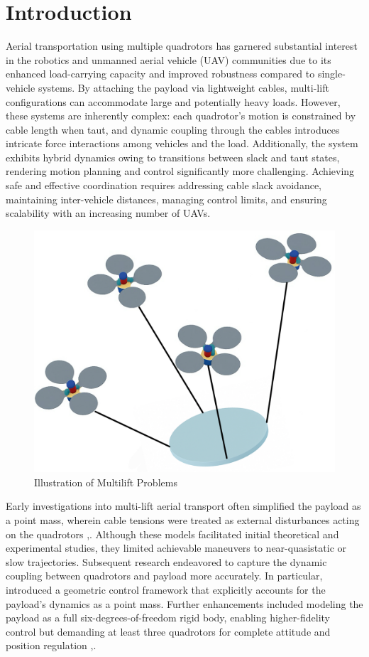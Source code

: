 \documentclass[12pt,twoside,letterpaper]{article}
\begin{document}
\section{Introduction}
Aerial transportation using multiple quadrotors has garnered substantial interest in the robotics and unmanned aerial vehicle (UAV) communities due to its enhanced load-carrying capacity and improved robustness compared to single-vehicle systems. By attaching the payload via lightweight cables, multi-lift configurations can accommodate large and potentially heavy loads. However, these systems are inherently complex: each quadrotor’s motion is constrained by cable length when taut, and dynamic coupling through the cables introduces intricate force interactions among vehicles and the load. Additionally, the system exhibits hybrid dynamics owing to transitions between slack and taut states, rendering motion planning and control significantly more challenging. Achieving safe and effective coordination requires addressing cable slack avoidance, maintaining inter-vehicle distances, managing control limits, and ensuring scalability with an increasing number of UAVs.

\begin{figure}[H]
    \centering
    \includegraphics[width=0.5\linewidth]{figures/Multilift.png}
    \caption{Illustration of Multilift Problems}
    \label{multilift}
\end{figure}

Early investigations into multi-lift aerial transport often simplified the payload as a point mass, wherein cable tensions were treated as external disturbances acting on the quadrotors \cite{Geo_point},\cite{2018point}. Although these models facilitated initial theoretical and experimental studies, they limited achievable maneuvers to near-quasistatic or slow trajectories. Subsequent research endeavored to capture the dynamic coupling between quadrotors and payload more accurately. In particular, \cite{2014Geo} introduced a geometric control framework that explicitly accounts for the payload’s dynamics as a point mass. Further enhancements included modeling the payload as a full six-degrees-of-freedom rigid body, enabling higher-fidelity control but demanding at least three quadrotors for complete attitude and position regulation \cite{sreenath2013dynamics},\cite{lee2017geometric}.
\end{document}
